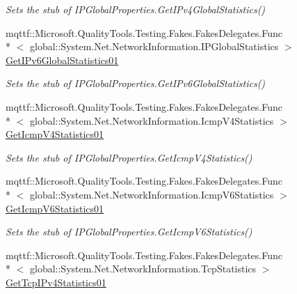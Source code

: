 \begin{DoxyCompactItemize}
\begin{DoxyCompactList}\small\item\em Sets the stub of I\-P\-Global\-Properties.\-Get\-I\-Pv4\-Global\-Statistics()\end{DoxyCompactList}\item 
mqttf\-::\-Microsoft.\-Quality\-Tools.\-Testing.\-Fakes.\-Fakes\-Delegates.\-Func\\*
$<$ global\-::\-System.\-Net.\-Network\-Information.\-I\-P\-Global\-Statistics $>$ \hyperlink{class_system_1_1_net_1_1_network_information_1_1_fakes_1_1_stub_i_p_global_properties_a13913451380f8c76437b297fa302d674}{Get\-I\-Pv6\-Global\-Statistics01}
\begin{DoxyCompactList}\small\item\em Sets the stub of I\-P\-Global\-Properties.\-Get\-I\-Pv6\-Global\-Statistics()\end{DoxyCompactList}\item 
mqttf\-::\-Microsoft.\-Quality\-Tools.\-Testing.\-Fakes.\-Fakes\-Delegates.\-Func\\*
$<$ global\-::\-System.\-Net.\-Network\-Information.\-Icmp\-V4\-Statistics $>$ \hyperlink{class_system_1_1_net_1_1_network_information_1_1_fakes_1_1_stub_i_p_global_properties_a787494693f1c74c3ff8136ed18c213d4}{Get\-Icmp\-V4\-Statistics01}
\begin{DoxyCompactList}\small\item\em Sets the stub of I\-P\-Global\-Properties.\-Get\-Icmp\-V4\-Statistics()\end{DoxyCompactList}\item 
mqttf\-::\-Microsoft.\-Quality\-Tools.\-Testing.\-Fakes.\-Fakes\-Delegates.\-Func\\*
$<$ global\-::\-System.\-Net.\-Network\-Information.\-Icmp\-V6\-Statistics $>$ \hyperlink{class_system_1_1_net_1_1_network_information_1_1_fakes_1_1_stub_i_p_global_properties_a085e07a24d85c8903c63f32f1d1307bf}{Get\-Icmp\-V6\-Statistics01}
\begin{DoxyCompactList}\small\item\em Sets the stub of I\-P\-Global\-Properties.\-Get\-Icmp\-V6\-Statistics()\end{DoxyCompactList}\item 
mqttf\-::\-Microsoft.\-Quality\-Tools.\-Testing.\-Fakes.\-Fakes\-Delegates.\-Func\\*
$<$ global\-::\-System.\-Net.\-Network\-Information.\-Tcp\-Statistics $>$ \hyperlink{class_system_1_1_net_1_1_network_information_1_1_fakes_1_1_stub_i_p_global_properties_a0c5722992d6ab058a5fc8a5268529b3c}{Get\-Tcp\-I\-Pv4\-Statistics01}

\end{DoxyCompactItemize}
